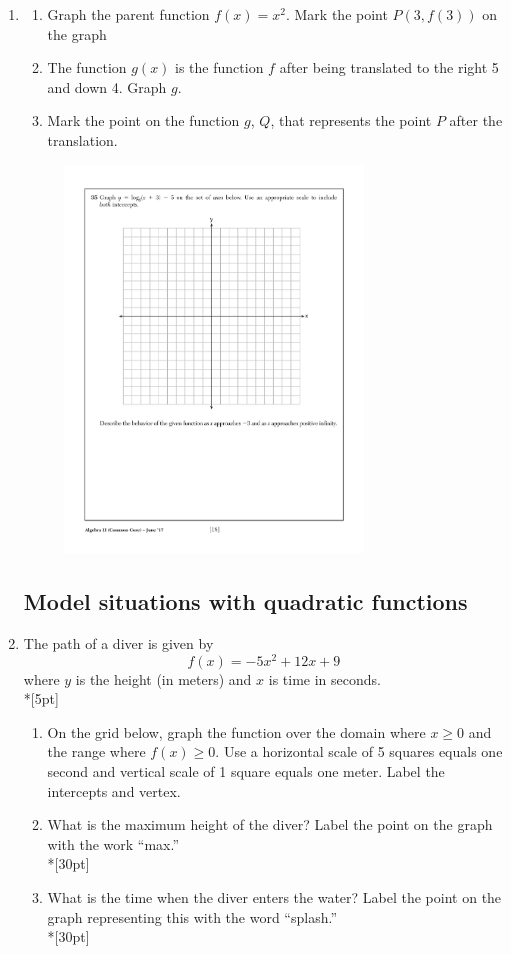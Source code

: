 \documentclass[]{book}
\begin{document}
\begin{enumerate}
\newpage
\item  
\begin{enumerate}
    \item Graph the parent function $f(x)=x^2$. Mark the point $P(3, f(3))$ on the graph
    \item The function $g(x)$ is the function $f$ after being translated to the right 5 and down 4. Graph $g$.
    \item Mark the point on the function $g$, $Q$, that represents the point $P$ after the translation.
\end{enumerate}

\begin{figure}[!ht]
    \centering
    \includegraphics[width=0.75\textwidth]{regents-grid.pdf}
\end{figure}

\newpage
\subsection*{Model situations with quadratic functions}
\item The path of a diver is given by 
\[f(x)=-5x^2+12x+9\]
where $y$ is the height (in meters) and $x$ is time in seconds.\\*[5pt]
\begin{enumerate}
    \item On the grid below, graph the function over the domain where $x\geq 0$ and the range where $f(x) \geq 0$. Use a horizontal scale of 5 squares equals one second and vertical scale of 1 square equals one meter. Label the intercepts and vertex.
    \item What is the maximum height of the diver? Label the point on the graph with the work ``max.''\\*[30pt]
    \item What is the time when the diver enters the water? Label the point on the graph representing this with the word ``splash.''\\*[30pt]
\end{enumerate}


\end{enumerate}
\end{document}
